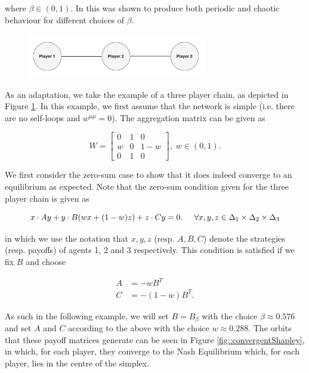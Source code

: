 \documentclass{article}
\theoremstyle{definition}
\begin{document}
	where $\beta \in (0, 1)$. In \cite{} this was shown to produce both periodic and chaotic behaviour for different choices of $\beta$. 

	\begin{figure}[t]
		\centering
		\includegraphics[width = 0.7\textwidth]{Figures/ThreePlayerNetwork.png}
		\caption{\label{fig::ThreePlayerNetwork}}
	\end{figure}

	As an adaptation, we take the example of a three player chain, as depicted in Figure \ref{fig::ThreePlayerNetwork}. In this example, we first assume that the network is simple (i.e. there are no self-loops and $w^{\mu \mu} = 0$). The aggregation matrix can be given as

	\begin{equation}
		W = \begin{bmatrix}
			0 & 1 & 0 \\
			w & 0 & 1 - w \\
			0 & 1 & 0
		\end{bmatrix}, \; w \in (0, 1).
	\end{equation}


	We first consider the zero-sum case to show that it does indeed converge to an equilibrium as expected. Note that the zero-sum condition given for the three player chain is given as

	\begin{equation}
		x \cdot A y + y \cdot B (w x + (1-w)z) + z \cdot C y = 0. \hspace{0.5cm} \forall x, y, z \in \Delta_1 \times \Delta_2 \times \Delta_3
	\end{equation}

	in which we use the notation that $x, y, z$ (resp. $A, B, C$) denote the strategies (resp. payoffs) of agents 1, 2 and 3 respectively. This condition is satisfied if we fix $B$ and choose

	\begin{align}
		A & = - w B^T \\
		C & = - (1 - w) B^T. 
	\end{align}

	As such in the following example, we will set $B = B_\beta$ with the choice $\beta \approx 0.576$ and set $A$ and $C$ according to the above with the choice $w \approx 0.288$. The orbits that these payoff matrices generate can be seen in Figure \ref{fig::convergentShapley}, in which, for each player, they converge to the Nash Equilibrium which, for each player, lies in the centre of the simplex.
\end{document}
